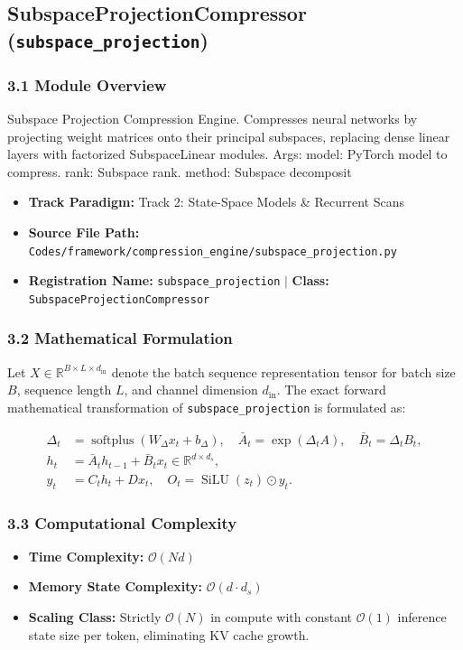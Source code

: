 \subsection{SubspaceProjectionCompressor (\texttt{subspace\_projection})}
\label{sec:app_module_subspace\_projection}

\subsubsection*{3.1 Module Overview}
Subspace Projection Compression Engine. Compresses neural networks by projecting weight matrices onto their principal subspaces, replacing dense linear layers with factorized SubspaceLinear modules.  Args:     model: PyTorch model to compress.     rank: Subspace rank.     method: Subspace decomposit
\begin{itemize}
    \item \textbf{Track Paradigm:} Track 2: State-Space Models & Recurrent Scans
    \item \textbf{Source File Path:} \texttt{Codes/framework/compression\_engine/subspace\_projection.py}
    \item \textbf{Registration Name:} \texttt{subspace\_projection} $\mid$ \textbf{Class:} \texttt{SubspaceProjectionCompressor}
\end{itemize}

\subsubsection*{3.2 Mathematical Formulation}
Let $X \in \mathbb{R}^{B \times L \times d_{\text{in}}}$ denote the batch sequence representation tensor for batch size $B$, sequence length $L$, and channel dimension $d_{\text{in}}$. The exact forward mathematical transformation of \texttt{subspace\_projection} is formulated as:

\begin{align}
\Delta_t &= \operatorname{softplus}(W_\Delta x_t + b_\Delta), \quad \bar{A}_t = \exp(\Delta_t A), \quad \bar{B}_t = \Delta_t B_t, \\
h_t &= \bar{A}_t h_{t-1} + \bar{B}_t x_t \in \mathbb{R}^{d \times d_s}, \\
y_t &= C_t h_t + D x_t, \quad O_t = \operatorname{SiLU}(z_t) \odot y_t.
\end{align}


\subsubsection*{3.3 Computational Complexity}
\begin{itemize}
    \item \textbf{Time Complexity:} $\mathcal{O}(N d)$
    \item \textbf{Memory State Complexity:} $\mathcal{O}(d \cdot d_s)$
    \item \textbf{Scaling Class:} Strictly $\mathcal{O}(N)$ in compute with constant $\mathcal{O}(1)$ inference state size per token, eliminating KV cache growth.
\end{itemize}

